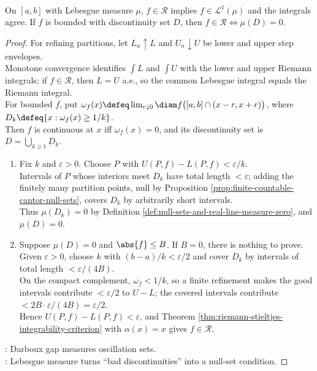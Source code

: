 \begin{theorem} \label{thm:riemann-lebesgue-comparison} \\
On $[a,b]$ with Lebesgue measure $\mu$, $f\in\mathcal{R}$ implies $f\in\mathscr{L}^1(\mu)$ and the integrals agree. If $f$ is bounded with discontinuity set $D$, then $f\in\mathcal{R}\iff\mu(D)=0$.
\begin{proof}
For refining partitions, let $L_n\uparrow L$ and $U_n\downarrow U$ be lower and upper step envelopes.\\
Monotone convergence identifies $\int L$ and $\int U$ with the lower and upper Riemann integrals; if $f\in\mathcal{R}$, then $L=U$ a.e., so the common Lebesgue integral equals the Riemann integral.\\
For bounded $f$, put $\omega_f(x)\defeq \lim_{r\downarrow0}\diam f\bigl([a,b]\cap(x-r,x+r)\bigr)$, where $D_k\defeq\{x:\omega_f(x)\geq1/k\}$.\\
Then $f$ is continuous at $x$ iff $\omega_f(x)=0$, and its discontinuity set is $D=\bigcup_{k\geq1}D_k$.
\begin{enumerate}[label=\roman*.]
\setlength{\itemsep}{0pt}
\item[$(\Rightarrow)$] Fix $k$ and $\varepsilon>0$. Choose $P$ with $U(P,f)-L(P,f)<\varepsilon/k$.\\
Intervals of $P$ whose interiors meet $D_k$ have total length $<\varepsilon$; adding the finitely many partition points, null by Proposition \ref{prop:finite-countable-cantor-null-sets}, covers $D_k$ by arbitrarily short intervals.\\
Thus $\mu(D_k)=0$ by Definition \ref{def:null-sets-and-real-line-measure-zero}, and $\mu(D)=0$.
\item[$(\Leftarrow)$] Suppose $\mu(D)=0$ and $\abs{f}\leq B$. If $B=0$, there is nothing to prove. Given $\varepsilon>0$, choose $k$ with $(b-a)/k<\varepsilon/2$ and cover $D_k$ by intervals of total length $<\varepsilon/(4B)$.\\
On the compact complement, $\omega_f<1/k$, so a finite refinement makes the good intervals contribute $<\varepsilon/2$ to $U-L$; the covered intervals contribute $<2B\cdot\varepsilon/(4B)=\varepsilon/2$.\\
Hence $U(P,f)-L(P,f)<\varepsilon$, and Theorem \ref{thm:riemann-stieltjes-integrability-criterion} with $\alpha(x)=x$ gives $f\in\mathcal{R}$.
\end{enumerate}
: Darboux gap measures oscillation sets.\\
: Lebesgue measure turns ``bad discontinuities'' into a null-set condition.
\end{proof}
\end{theorem}


